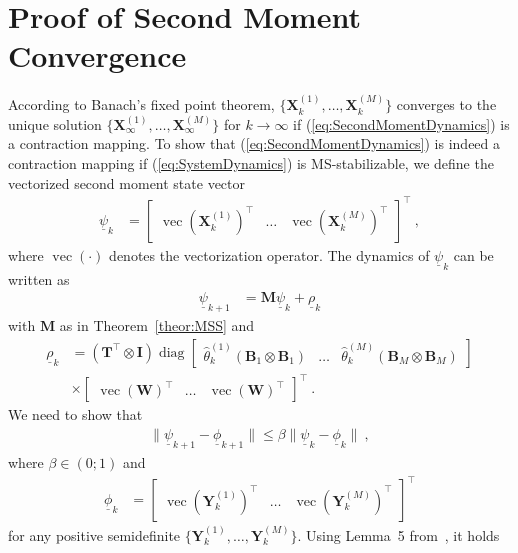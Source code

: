 \documentclass[preprint,1p,11pt]{IR-Template/ISAS_IR}
\newcommand{\nvec}[1]{\ensuremath{{{\underline{#1}}}}}
\newcommand{\mat}[1]{{\ensuremath{{\mathbf{#1}}}}}
\newcommand{\tr}{^{\top}}
\DeclareMathOperator{\vvec}{vec}
\renewcommand{\vec}[1]{\vvec\klammer{#1}}
\newcommand{\identitymatrix}{\mat{I}}
\newcommand{\klammer}[1]{\left( #1 \right)}
\newcommand{\kron}[2]{{#1 \otimes #2}}
\DeclareMathOperator{\diag}{diag}
\newcommand{\Bsys}[1]{\mat{B}_{#1}}
\newcommand{\wCov}{\mat{W}}
\newcommand{\bigN}[1]{\nvec{\rho}_{#1}}
\newcommand{\modeest}[2]{\widehat{\theta}^{(#1)}_{#2}}
\newcommand{\bigM}{\mat{M}}
\newcommand{\TransitionMatrix}[1]{\mat{T}_{#1}}
\newcommand{\Xsysest}[2]{\mat{X}^{(#1)}_{#2}}
\newcommand{\NumModes}{M}
\newcommand{\vectorizedState}[1]{\nvec{\psi}_{#1}}
\begin{document}
   \section{Proof of Second Moment Convergence}
   	\label{app:ProofConvergence}
   	According to Banach's fixed point theorem, $\{\Xsysest{1}{k}, \dots, \Xsysest{\NumModes}{k}\}$ converges to the unique solution $\{\Xsysest{1}{\infty}, \dots,\Xsysest{\NumModes}{\infty}\}$ for $k\rightarrow\infty$ if (\ref{eq:SecondMomentDynamics}) is a contraction mapping. To show that (\ref{eq:SecondMomentDynamics}) is indeed a contraction mapping if (\ref{eq:SystemDynamics}) is MS-stabilizable, we define the vectorized second moment state vector
\begin{align*}
\vectorizedState{k}
	&=
	\begin{bmatrix}
		\vec{\Xsysest{1}{k}}\tr & \dots & \vec{\Xsysest{\NumModes}{k}}\tr
	\end{bmatrix}\tr\ ,
\end{align*}
where $\vec{\cdot}$ denotes the vectorization operator. The dynamics of $\vectorizedState{k}$ can be written as
\begin{align}
\vectorizedState{k+1}
	&=
	\bigM\vectorizedState{k} + \bigN{k}
\label{eq:ContractionMapping}
\end{align}
with $\bigM$ as in Theorem~\ref{theor:MSS} and
\begin{align*}
\bigN{k}
	&=
	\klammer{\kron{\TransitionMatrix{}\tr}{\identitymatrix}} \diag\begin{bmatrix}\modeest{1}{k}(\kron{\Bsys{1}}{\Bsys{1}}) & \dots & \modeest{\NumModes}{k}(\kron{\Bsys{\NumModes}}{\Bsys{\NumModes}})\end{bmatrix}\\
	&\times
	\begin{bmatrix}\vec{\wCov}\tr & \dots & \vec{\wCov}\tr\end{bmatrix}\tr\ .
\end{align*}
We need to show that
\begin{align*}
\|\vectorizedState{k+1} - \nvec{\phi}_{k+1}\| \leq \beta \|\vectorizedState{k} - \nvec{\phi}_{k}\|\ ,
\end{align*}
where $\beta\in(0;1)$ and
\begin{align*}
\nvec{\phi}_k
	&=
	\begin{bmatrix}
		\vec{\mat{Y}^{(1)}_{k}}\tr & \dots & \vec{\mat{Y}^{(\NumModes)}_{k}}\tr
	\end{bmatrix}\tr
\end{align*}
for any positive semidefinite $\{\mat{Y}^{(1)}_{k},\dots,\mat{Y}^{(\NumModes)}_{k}\}$. Using Lemma~5 from~\cite{Wang_86}, it holds
\end{document}
